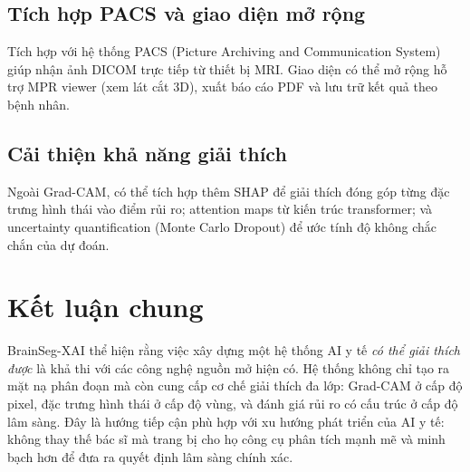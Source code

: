 \subsection{Tích hợp PACS và giao diện mở rộng}

Tích hợp với hệ thống PACS (Picture Archiving and Communication System) giúp nhận ảnh DICOM trực tiếp từ thiết bị MRI. Giao diện có thể mở rộng hỗ trợ MPR viewer (xem lát cắt 3D), xuất báo cáo PDF và lưu trữ kết quả theo bệnh nhân.

\subsection{Cải thiện khả năng giải thích}

Ngoài Grad-CAM, có thể tích hợp thêm SHAP để giải thích đóng góp từng đặc trưng hình thái vào điểm rủi ro; attention maps từ kiến trúc transformer; và uncertainty quantification (Monte Carlo Dropout) để ước tính độ không chắc chắn của dự đoán.

\section{Kết luận chung}

BrainSeg-XAI thể hiện rằng việc xây dựng một hệ thống AI y tế \textit{có thể giải thích được} là khả thi với các công nghệ nguồn mở hiện có. Hệ thống không chỉ tạo ra mặt nạ phân đoạn mà còn cung cấp cơ chế giải thích đa lớp: Grad-CAM ở cấp độ pixel, đặc trưng hình thái ở cấp độ vùng, và đánh giá rủi ro có cấu trúc ở cấp độ lâm sàng. Đây là hướng tiếp cận phù hợp với xu hướng phát triển của AI y tế: không thay thế bác sĩ mà trang bị cho họ công cụ phân tích mạnh mẽ và minh bạch hơn để đưa ra quyết định lâm sàng chính xác.

